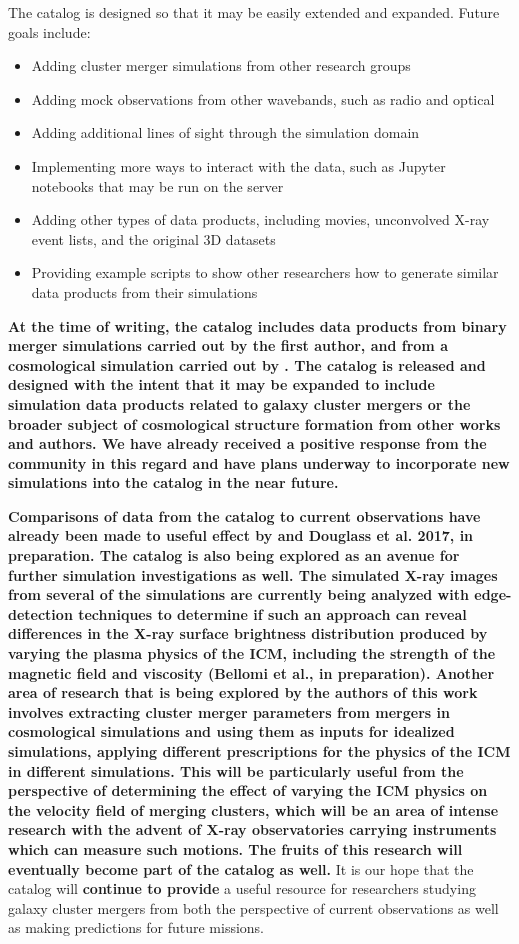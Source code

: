 \documentclass{emulateapj}
\begin{document}
The catalog is designed so that it may be easily extended and expanded. Future goals include:

\begin{itemize}
\item Adding cluster merger simulations from other research groups
\item Adding mock observations from other wavebands, such as radio and optical
\item Adding additional lines of sight through the simulation domain
\item Implementing more ways to interact with the data, such as Jupyter notebooks that may be run on the server
\item Adding other types of data products, including movies, unconvolved X-ray event lists, and the original 3D datasets
\item Providing example scripts to show other researchers how to generate similar data products from their simulations
\end{itemize}

\textbf{At the time of writing, the catalog includes data products from binary merger simulations carried out by the first author, and from a cosmological simulation carried out by \citet{nel14}. The catalog is released and designed with the intent that it may be expanded to include simulation data products related to galaxy cluster mergers or the broader subject of cosmological structure formation from other works and authors. We have already received a positive response from the community in this regard and have plans underway to incorporate new simulations into the catalog in the near future.}

{\bf Comparisons of data from the catalog to current observations have already been made to useful effect by \citet{wal17} and Douglass et al. 2017, in preparation. The catalog is also being explored as an avenue for further simulation investigations as well. The simulated X-ray images from several of the simulations are currently being analyzed with edge-detection techniques to determine if such an approach can reveal differences in the X-ray surface brightness distribution produced by varying the plasma physics of the ICM, including the strength of the magnetic field and viscosity (Bellomi et al., in preparation). Another area of research that is being explored by the authors of this work involves extracting cluster merger parameters from mergers in cosmological simulations and using them as inputs for idealized simulations, applying different prescriptions for the physics of the ICM in different simulations. This will be particularly useful from the perspective of determining the effect of varying the ICM physics on the velocity field of merging clusters, which will be an area of intense research with the advent of X-ray observatories carrying instruments which can measure such motions. The fruits of this research will eventually become part of the catalog as well.} It is our hope that the catalog will {\bf continue to provide} a useful resource for researchers studying galaxy cluster mergers from both the perspective of current observations as well as making predictions for future missions. 
\end{document}
